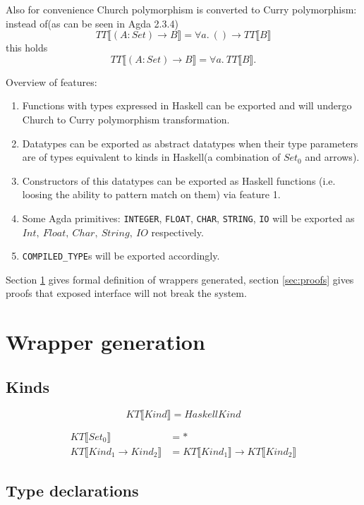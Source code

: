 Also for convenience Church polymorphism is converted to Curry polymorphism:
instead of(as can be seen in Agda 2.3.4)
\[
   TT\llbracket (A : Set) \rightarrow B \rrbracket = \forall a.\ () \rightarrow TT\llbracket B \rrbracket
\]
this holds
\[
   TT\llbracket (A : Set) \rightarrow B \rrbracket = \forall a.\ TT\llbracket B \rrbracket.
\]

Overview of features:
\begin{enumerate}
\item Functions with types expressed in Haskell can be exported and will
      undergo Church to Curry polymorphism transformation.
\item Datatypes can be exported as abstract datatypes when their type
      parameters are of types equivalent to kinds in Haskell(a combination
      of \(Set_0\) and arrows).
\item Constructors of this datatypes can be exported as Haskell functions
      (i.e. loosing the ability to pattern match on them) via feature 1.
\item Some Agda primitives: \texttt{INTEGER}, \texttt{FLOAT}, \texttt{CHAR},
      \texttt{STRING}, \texttt{IO} will be exported as \(Int,\ Float,\ Char,\ String,\ IO\)
      respectively.
\item \texttt{COMPILED\_TYPE}s will be exported accordingly.
\end{enumerate}

Section \ref{sec:wrappers} gives formal definition of wrappers generated,
section \ref{sec:proofs} gives proofs that exposed interface will not break the system.

\section{Wrapper generation}\label{sec:wrappers}

\subsection{Kinds}
\[ KT\llbracket Kind \rrbracket = HaskellKind \]

\begin{align*}
   KT\llbracket Set_0 \rrbracket &= *\\
   KT\llbracket Kind_1 \rightarrow Kind_2 \rrbracket &=
      KT\llbracket Kind_1 \rrbracket \rightarrow KT\llbracket Kind_2 \rrbracket
\end{align*}

\subsection{Type declarations}

